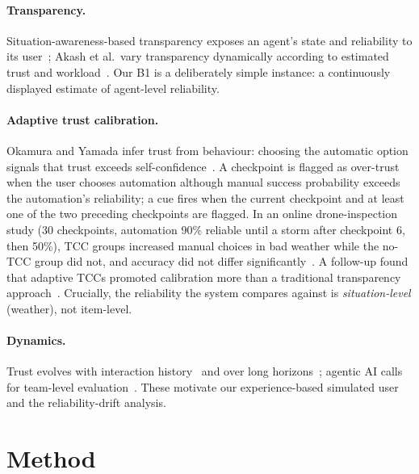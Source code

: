 \documentclass[10pt]{article}
\begin{document}
\paragraph{Transparency.} Situation-awareness-based transparency exposes an agent's state and reliability to its user~\cite{chen2018situation}; Akash et al.\ vary transparency dynamically according to estimated trust and workload~\cite{akash2020human}. Our B1 is a deliberately simple instance: a continuously displayed estimate of agent-level reliability.

\paragraph{Adaptive trust calibration.} Okamura and Yamada infer trust from behaviour: choosing the automatic option signals that trust exceeds self-confidence~\cite{okamura2020adaptive}. A checkpoint is flagged as over-trust when the user chooses automation although manual success probability exceeds the automation's reliability; a cue fires when the current checkpoint and at least one of the two preceding checkpoints are flagged. In an online drone-inspection study (30 checkpoints, automation 90\% reliable until a storm after checkpoint 6, then 50\%), TCC groups increased manual choices in bad weather while the no-TCC group did not, and accuracy did not differ significantly~\cite{okamura2020adaptive}. A follow-up found that adaptive TCCs promoted calibration more than a traditional transparency approach~\cite{okamura2020empirical}. Crucially, the reliability the system compares against is \emph{situation-level} (weather), not item-level.

\paragraph{Dynamics.} Trust evolves with interaction history~\cite{pynadath2019markovian} and over long horizons~\cite{devisser2020longitudinal}; agentic AI calls for team-level evaluation~\cite{bruni2025frontiers}. These motivate our experience-based simulated user and the reliability-drift analysis.

\section{Method}
\end{document}
